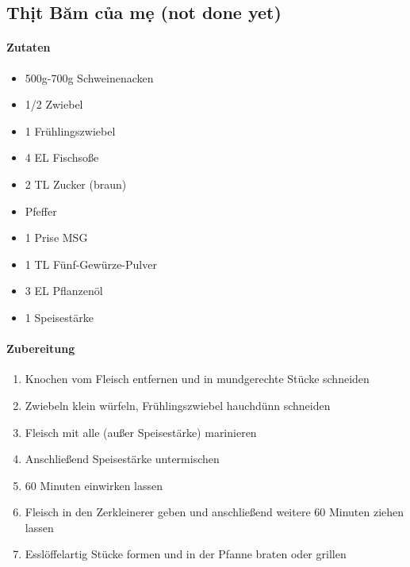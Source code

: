 \newpage
{}
\subsection{Thịt Băm của mẹ (not done yet)}
\paragraph{Zutaten}
\begin{itemize}[noitemsep]
	\item 500g-700g Schweinenacken
	\item 1/2 Zwiebel
	\item 1 Frühlingszwiebel 
	\item 4 EL Fischsoße
	\item 2 TL Zucker (braun)
	\item Pfeffer
	\item 1 Prise MSG
	\item 1 TL Fünf-Gewürze-Pulver
	\item 3 EL Pflanzenöl
	\item 1 Speisestärke
\end{itemize}
\paragraph{Zubereitung}
\begin{enumerate}[noitemsep]
	\item Knochen vom Fleisch entfernen und in mundgerechte Stücke schneiden
	\item Zwiebeln klein würfeln, Frühlingszwiebel hauchdünn schneiden
	\item Fleisch mit alle (außer Speisestärke) marinieren
	\item Anschließend Speisestärke untermischen
	\item 60 Minuten einwirken lassen
	\item Fleisch in den Zerkleinerer geben und anschließend weitere 60 Minuten ziehen lassen
	\item Esslöffelartig Stücke formen und in der Pfanne braten oder grillen
\end{enumerate}